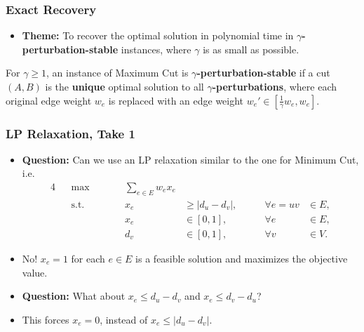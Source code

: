 \documentclass{beamer}
\begin{document}
    \begin{frame}
        \frametitle{Exact Recovery}
    
        \begin{itemize}
            \item {\bf Theme:} To recover the optimal solution in polynomial time in {\bf $\gamma$-perturbation-stable} instances, where $\gamma$ is as small as possible.
        \end{itemize}

        \pause

        \begin{definition}
            For $\gamma \geq 1$, an instance of {\sc Maximum Cut} is {\bf $\gamma$-perturbation-stable} if a cut $(A, B)$ is the {\bf unique} optimal solution to all {\bf $\gamma$-perturbations}, where each original edge weight $w_e$ is replaced with an edge weight $w_e' \in [\frac{1}{\gamma} w_e, w_e]$.
        \end{definition}
    \end{frame}

    \begin{frame}
        \frametitle{LP Relaxation, Take 1}
    
        \begin{itemize}
            \item {\bf Question:} Can we use an LP relaxation similar to the one for {\sc Minimum Cut}, i.e.
            \begin{alignat*}{4}
                && \max \qquad && \sum_{e \in E} w_e x_e \\
                && \text{s.t.} \qquad && x_e & \geq \left|d_u - d_v\right|, & \qquad \forall e = uv & \in E, \\
                && && x_e & \in [0, 1], & \qquad \forall e & \in E, \\
                && && d_v & \in [0, 1], & \qquad \forall v & \in V.
              \end{alignat*}
              \pause
              \vspace{-1em}
              \item No! $x_e = 1$ for each $e \in E$ is a feasible solution and maximizes the objective value. \pause
              \item {\bf Question:} What about $x_e \leq d_u - d_v$ and $x_e \leq d_v - d_u$? \pause
              \item This forces $x_e = 0$, instead of $x_e \leq |d_u - d_v|$.
        \end{itemize}
    \end{frame}
\end{document}
